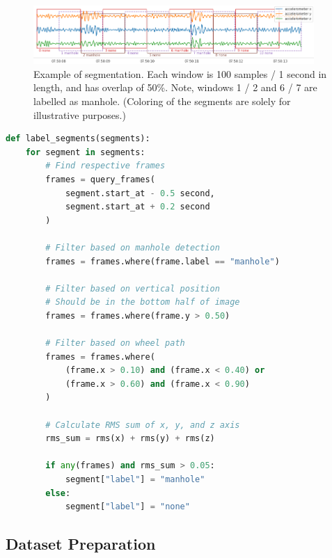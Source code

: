\begin{figure}[ht]
\begin{center}
\includegraphics[width=0.95\textwidth,keepaspectratio]{images/5_multimodal_fusion/segment-example.png}
\captionsetup{width=.95\textwidth}
\caption{Example of segmentation. Each window is 100 samples / 1 second in length, and has overlap of 50\%. Note, windows 1 / 2 and 6 / 7 are labelled as manhole. (Coloring of the segments are solely for illustrative purposes.)}
\label{fig:segmentation}
\end{center}
\end{figure}


\begin{minipage}{.95\textwidth}
\begin{lstlisting}[language=Python, caption={Pseudo implementation of automatically labelling segments.}, label={list:label_segments}]
def label_segments(segments):
    for segment in segments:
        # Find respective frames
        frames = query_frames(
            segment.start_at - 0.5 second,
            segment.start_at + 0.2 second
        )
        
        # Filter based on manhole detection
        frames = frames.where(frame.label == "manhole")
        
        # Filter based on vertical position
        # Should be in the bottom half of image
        frames = frames.where(frame.y > 0.50)
        
        # Filter based on wheel path
        frames = frames.where(
            (frame.x > 0.10) and (frame.x < 0.40) or
            (frame.x > 0.60) and (frame.x < 0.90)
        )
        
        # Calculate RMS sum of x, y, and z axis
        rms_sum = rms(x) + rms(y) + rms(z)

        if any(frames) and rms_sum > 0.05:
            segment["label"] = "manhole"
        else:
            segment["label"] = "none"
\end{lstlisting}
\end{minipage}


\subsection{Dataset Preparation}

